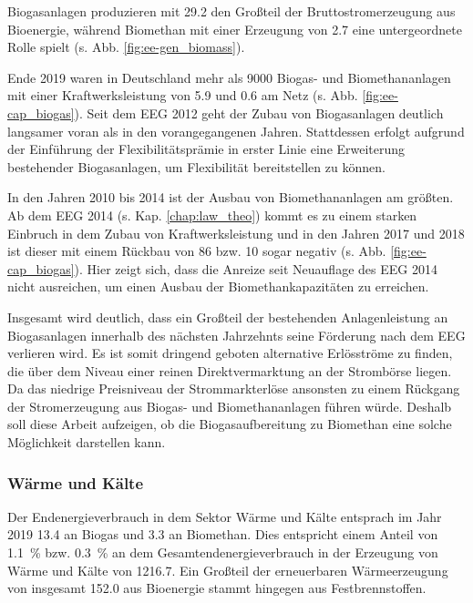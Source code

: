 Biogasanlagen produzieren mit \SI{29.2}{\twh} den Großteil der Bruttostromerzeugung aus Bioenergie, während Biomethan mit einer Erzeugung von \SI{2.7}{\twh} eine untergeordnete Rolle spielt (s. Abb. \ref{fig:ee-gen_biomass}). \parencite{BWE2020} 



Ende 2019 waren in Deutschland mehr als \SI{9000}{\relax} Biogas- und Biomethananlagen mit einer Kraftwerksleistung von \SI{5.9}{\gw} und \SI{0.6}{\gw} am Netz (s. Abb. \ref{fig:ee-cap_biogas}). Seit dem \gls{EEG} \SI{2012}{\relax} geht der Zubau von Biogasanlagen deutlich langsamer voran als in den vorangegangenen Jahren. Stattdessen erfolgt aufgrund der Einführung der Flexibilitätsprämie in erster Linie eine Erweiterung bestehender Biogasanlagen, um Flexibilität bereitstellen zu können. \parencite{BWE2020} \parencite{DanielGromke2019}



In den Jahren 2010 bis \SI{2014}{\relax} ist der Ausbau von Biomethananlagen am größten. Ab dem \gls{EEG} \SI{2014}{\relax} (s. Kap. \ref{chap:law_theo}) kommt es zu einem starken Einbruch in dem Zubau von Kraftwerksleistung und in den Jahren \SI{2017}{\relax} und \SI{2018}{\relax} ist dieser mit einem Rückbau von \SI{86}{\mw} bzw. \SI{10}{\mw} sogar negativ (s. Abb. \ref{fig:ee-cap_biogas}). Hier zeigt sich, dass die Anreize seit Neuauflage des \gls{EEG} \SI{2014}{\relax} nicht ausreichen, um einen Ausbau der Biomethankapazitäten zu erreichen. \parencite{BWE2020} \smallskip

Insgesamt wird deutlich, dass ein Großteil der bestehenden Anlagenleistung an Biogasanlagen innerhalb des nächsten Jahrzehnts seine Förderung nach dem \gls{EEG} verlieren wird. Es ist somit dringend geboten alternative Erlösströme zu finden, die über dem Niveau einer reinen Direktvermarktung an der Strombörse liegen. Da das niedrige Preisniveau der Strommarkterlöse ansonsten zu einem Rückgang der Stromerzeugung aus Biogas- und Biomethananlagen führen würde. Deshalb soll diese Arbeit aufzeigen, ob die Biogasaufbereitung zu Biomethan eine solche Möglichkeit darstellen kann.



\subsubsection{Wärme und Kälte}

Der Endenergieverbrauch in dem Sektor Wärme und Kälte entsprach im Jahr 2019 \SI{13.4}{\twh} an Biogas und \SI{3.3}{\twh} an Biomethan. Dies entspricht einem Anteil von \SI{1.1}{\percent} bzw. \SI{0.3}{\percent} an dem Gesamtendenergieverbrauch in der Erzeugung von Wärme und Kälte von \SI{1216.7}{\twh}. Ein Großteil der erneuerbaren Wärmeerzeugung von insgesamt \SI{152.0}{\twh} aus Bioenergie stammt hingegen aus Festbrennstoffen. \parencite{BWE2020}\smallskip

